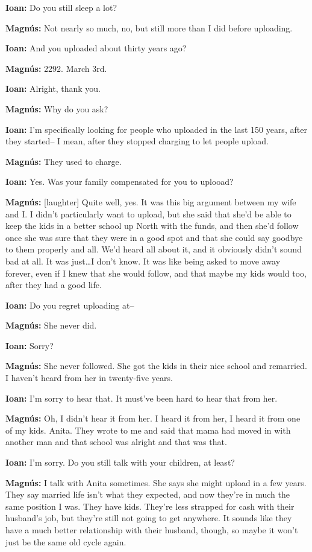 \textbf{Ioan:} Do you still sleep a lot?

\textbf{Magnús:} Not nearly so much, no, but still more than I did before uploading.

\textbf{Ioan:} And you uploaded about thirty years ago?

\textbf{Magnús:} 2292. March 3rd.

\textbf{Ioan:} Alright, thank you.

\textbf{Magnús:} Why do you ask?

\textbf{Ioan:} I'm specifically looking for people who uploaded in the last 150 years, after they started-- I mean, after they stopped charging to let people upload.

\textbf{Magnús:} They used to charge.

\textbf{Ioan:} Yes. Was your family compensated for you to uplooad?

\textbf{Magnús:} {[}laughter{]} Quite well, yes. It was this big argument between my wife and I. I didn't particularly want to upload, but she said that she'd be able to keep the kids in a better school up North with the funds, and then she'd follow once she was sure that they were in a good spot and that she could say goodbye to them properly and all. We'd heard all about it, and it obviously didn't sound bad at all. It was just\ldots I don't know. It was like being asked to move away forever, even if I knew that she would follow, and that maybe my kids would too, after they had a good life.

\textbf{Ioan:} Do you regret uploading at--

\textbf{Magnús:} She never did.

\textbf{Ioan:} Sorry?

\textbf{Magnús:} She never followed. She got the kids in their nice school and remarried. I haven't heard from her in twenty-five years.

\textbf{Ioan:} I'm sorry to hear that. It must've been hard to hear that from her.

\textbf{Magnús:} Oh, I didn't hear it from her. I heard it from her, I heard it from one of my kids. Anita. They wrote to me and said that mama had moved in with another man and that school was alright and that was that.

\textbf{Ioan:} I'm sorry. Do you still talk with your children, at least?

\textbf{Magnús:} I talk with Anita sometimes. She says she might upload in a few years. They say married life isn't what they expected, and now they're in much the same position I was. They have kids. They're less strapped for cash with their husband's job, but they're still not going to get anywhere. It sounds like they have a much better relationship with their husband, though, so maybe it won't just be the same old cycle again.


